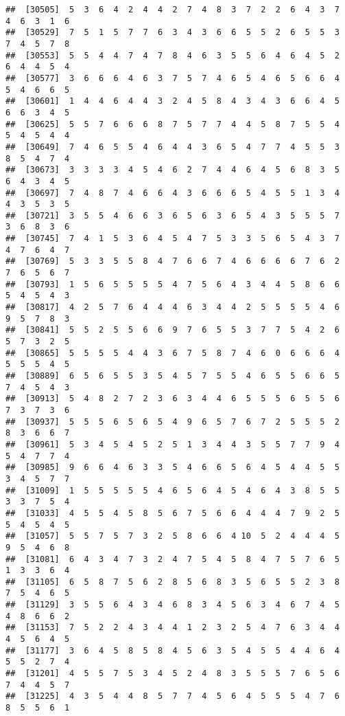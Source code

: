 \documentclass[
]{book}
\begin{document}
\begin{verbatim}
##  [30505]  5  3  6  4  2  4  4  2  7  4  8  3  7  2  2  6  4  3  7  4  6  3  1  6
##  [30529]  7  5  1  5  7  7  6  3  4  3  6  6  5  5  2  6  5  5  3  7  4  5  7  8
##  [30553]  5  5  4  4  7  4  7  8  4  6  3  5  5  6  4  6  4  5  2  6  4  4  5  4
##  [30577]  3  6  6  6  4  6  3  7  5  7  4  6  5  4  6  5  6  6  4  5  4  6  6  5
##  [30601]  1  4  4  6  4  4  3  2  4  5  8  4  3  4  3  6  6  4  5  6  6  3  4  5
##  [30625]  5  5  7  6  6  6  8  7  5  7  7  4  4  5  8  7  5  5  4  5  4  5  4  4
##  [30649]  7  4  6  5  5  4  6  4  4  3  6  5  4  7  7  4  5  5  3  8  5  4  7  4
##  [30673]  3  3  3  3  4  5  4  6  2  7  4  4  6  4  5  6  8  3  5  6  4  3  4  5
##  [30697]  7  4  8  7  4  6  6  4  3  6  6  6  5  4  5  5  1  3  4  4  3  5  3  5
##  [30721]  3  5  5  4  6  6  3  6  5  6  3  6  5  4  3  5  5  5  7  3  6  8  3  6
##  [30745]  7  4  1  5  3  6  4  5  4  7  5  3  3  5  6  5  4  3  7  4  7  6  4  7
##  [30769]  5  3  3  5  5  8  4  7  6  6  7  4  6  6  6  6  7  6  2  7  6  5  6  7
##  [30793]  1  5  6  5  5  5  5  4  7  5  6  4  3  4  4  5  8  6  6  5  4  5  4  3
##  [30817]  4  2  5  7  6  4  4  4  6  3  4  4  2  5  5  5  5  4  6  9  5  7  8  3
##  [30841]  5  5  2  5  5  6  6  9  7  6  5  5  3  7  7  5  4  2  6  5  7  3  2  5
##  [30865]  5  5  5  5  4  4  3  6  7  5  8  7  4  6  0  6  6  6  4  5  5  5  4  5
##  [30889]  6  5  6  5  5  3  5  4  5  7  5  5  4  6  5  5  6  6  5  7  4  5  4  3
##  [30913]  5  4  8  2  7  2  3  6  3  4  4  6  5  5  5  6  5  5  6  7  3  7  3  6
##  [30937]  5  5  5  6  5  6  5  4  9  6  5  7  6  7  2  5  5  5  2  8  3  6  6  7
##  [30961]  5  3  4  5  4  5  2  5  1  3  4  4  3  5  5  7  7  9  4  5  4  7  7  4
##  [30985]  9  6  6  4  6  3  3  5  4  6  6  5  6  4  5  4  4  5  5  3  4  5  7  7
##  [31009]  1  5  5  5  5  5  4  6  5  6  4  5  4  6  4  3  8  5  5  3  3  7  5  4
##  [31033]  4  5  5  4  5  8  5  6  7  5  6  6  4  4  4  7  9  2  5  5  4  5  4  5
##  [31057]  5  5  7  5  7  3  2  5  8  6  6  4 10  5  2  4  4  4  5  9  5  4  6  8
##  [31081]  6  4  3  4  7  3  2  4  7  5  4  5  8  4  7  5  7  6  5  1  3  3  6  4
##  [31105]  6  5  8  7  5  6  2  8  5  6  8  3  5  6  5  5  2  3  8  7  5  4  6  5
##  [31129]  3  5  5  6  4  3  4  6  8  3  4  5  6  3  4  6  7  4  5  4  8  6  6  2
##  [31153]  7  5  2  2  4  3  4  4  1  2  3  2  5  4  7  6  3  4  4  4  5  6  4  5
##  [31177]  3  6  4  5  8  5  8  4  5  6  3  5  4  5  5  4  4  6  4  5  5  2  7  4
##  [31201]  4  5  5  7  5  3  4  5  2  4  8  3  5  5  5  7  6  5  6  7  4  4  5  7
##  [31225]  4  3  5  4  4  8  5  7  7  4  5  6  4  5  5  5  4  7  6  8  5  5  6  1

\end{verbatim}
\end{document}

